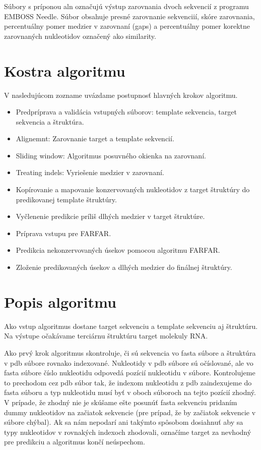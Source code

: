 \indent Súbory s príponou aln označujú výstup zarovnania dvoch sekvencií z programu EMBOSS Needle. Súbor obsahuje presné zarovnanie sekvenciií, skóre zarovnania, percentuálny pomer medzier v zarovnaní (gaps) a percentuálny pomer korektne zarovnaných nukleotidov označený ako similarity. 


\section{Kostra algoritmu}

V nasledujúcom zozname uvázdame postupnosť hlavných krokov algoritmu.
\begin{itemize}
\item Predpríprava a validácia vstupných súborov: template sekvencia, target sekvencia a štruktúra.
\item Alignemnt: Zarovnanie target a template sekvencií.
\item Sliding window: Algoritmus posuvného okienka na zarovnaní.
\item Treating indels: Vyriešenie medzier v zarovnaní.
\item Kopírovanie a mapovanie konzervovaných nukleotidov z target štruktúry do predikovanej template štruktúry.
\item Vyčlenenie predikcie príliš dlhých medzier v target štruktúre.
\item Príprava vstupu pre FARFAR.
\item Predikcia nekonzervovaných úsekov pomocou algoritmu FARFAR.
\item Zloženie predikovaných úsekov a dlhých medzier do finálnej štruktúry.
\end{itemize}

\section{Popis algoritmu}
Ako vstup algoritmus dostane target sekvenciu a template sekvenciu aj štruktúru. Na výstupe očakávame terciárnu štruktúru target molekuly RNA.


\indent  Ako prvý krok algoritmus skontroluje, či sú sekvencia vo fasta súbore a štruktúra v pdb súbore rovnako indexované. Nukleotidy v pdb súbore sú očíslované, ale vo fasta súbore číslo nukleotidu odpovedá pozícií nukleotidu v súbore. Kontrolujeme to prechodom cez pdb súbor tak, že indexom nukleotidu z pdb zaindexujeme do fasta súboru a typ nukleotidu musí byť v oboch súboroch na tejto pozícií zhodný. V prípade, že zhodný nie je skúšame ešte posunúť fasta sekvenciu pridaním dummy nukleotidov na začiatok sekvencie (pre prípad, že by začiatok sekvencie v súbore chýbal). Ak sa nám nepodarí ani takýmto spôsobom dosiahnuť aby sa typy nukleotidov v rovnakých indexoch zhodovali, označíme target za nevhodný pre predikciu a algoritmus končí neúspechom.


